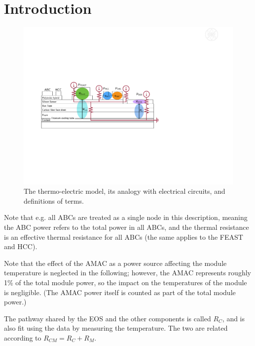 
\section{Introduction}


\begin{figure}[ht!]
\includegraphics[width=.99\textwidth]{figures/thermoelectric_model.pdf}
\caption{
The thermo-electric model, its analogy with electrical circuits, and definitions of terms.
}
\label{thermoelectric_model}
\end{figure}

Note that e.g. all ABCs are treated as a single node in this description, meaning the ABC power refers
to the total power in all ABCs, and the thermal resistance is an effective thermal resistance for all
ABCs (the same applies to the FEAST and HCC).

Note that the effect of the AMAC as a power source affecting the module temperature is neglected in
the following; however, the AMAC represents roughly 1\% of the total module power, so the impact on
the temperatures of the module is negligible. (The AMAC power itself is counted as part of the total
module power.)

The pathway shared by the EOS and the other components is called $R_{C}$, and is also fit using the
data by measuring the temperature. The two are related according to $R_{CM} = R_C + R_M$.
